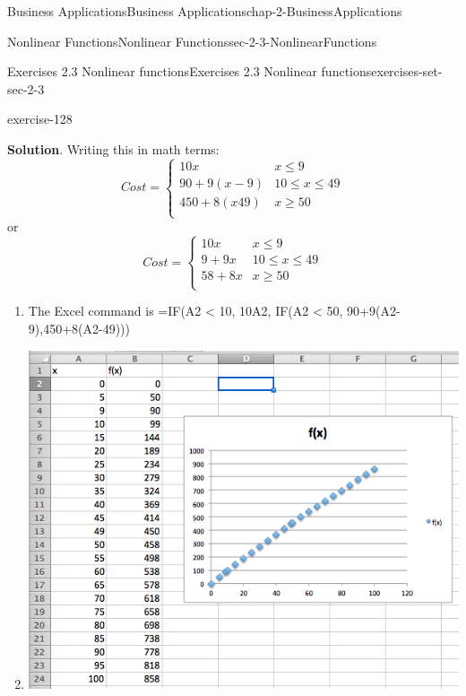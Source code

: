 \documentclass[oneside,10pt,]{book}
\numberwithin{equation}{section}
\begin{document}
\begin{chapterptx}{Business Applications}{}{Business Applications}{}{}{chap-2-BusinessApplications}
\begin{sectionptx}{Nonlinear Functions}{}{Nonlinear Functions}{}{}{sec-2-3-NonlinearFunctions}
\begin{exercises-subsection-numberless}{Exercises 2.3 Nonlinear functions}{}{Exercises 2.3 Nonlinear functions}{}{}{exercises-set-sec-2-3}
\begin{exercisegroup}
\begin{divisionexerciseeg}{13}{}{}{exercise-128}
\par\smallskip%
\noindent\textbf{Solution}.\hypertarget{solution-62}{}\quad%
\hypertarget{p-857}{}%
Writing this in math terms:%
%
\begin{equation*}
Cost=\begin{cases}
10x&x \le 9\\
90+9(x-9)&10\le x\le 49\\
450+8(x49)&x\ge 50\\
\end{cases}
\end{equation*}
\hypertarget{p-858}{}%
or%
%
\begin{equation*}
Cost=\begin{cases}
10x&x \le 9\\
9+9x&10\le x\le 49\\
58+8x&x\ge 50\\
\end{cases}
\end{equation*}
\leavevmode%
\begin{enumerate}[label=(\alph*)]
\item\hypertarget{li-248}{}\hypertarget{p-859}{}%
The Excel command is =IF(A2 \textless{} 10, 10\textasteriskcentered{}A2, IF(A2 \textless{} 50, 90+9\textasteriskcentered{}(A2-9),450+8\textasteriskcentered{}(A2-49)))%
\item\hypertarget{li-249}{}\leavevmode%
\begin{sidebyside}{1}{0.05}{0.05}{0}%
\begin{sbspanel}{0.9}%
\includegraphics[width=1\linewidth]{images/sec2-3-sol13a.png}

\end{sbspanel}
\end{sidebyside}
\end{enumerate}
\end{divisionexerciseeg}
\end{exercisegroup}
\end{exercises-subsection-numberless}
\end{sectionptx}
\end{chapterptx}
\end{document}
